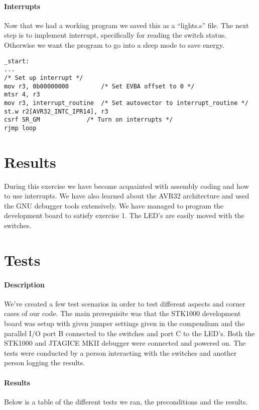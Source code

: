 \documentclass[a4paper,11pt]{article}
\begin{document}
\paragraph{Interrupts}
Now that we had a working program we saved this as a “lights.s” file. The next step is to implement interrupt, specifically for reading the switch status. Otherwise we want the program to go into a sleep mode to save energy. 

\begin{lstlisting}
_start:
...
/* Set up interrupt */
mov r3, 0b00000000  	   /* Set EVBA offset to 0 */
mtsr 4, r3			
mov r3, interrupt_routine  /* Set autovector to interrupt_routine */
st.w r2[AVR32_INTC_IPR14], r3	
csrf SR_GM  		   /* Turn on interrupts */
rjmp loop
\end{lstlisting}

\section{Results}
During this exercise we have become acquainted with assembly coding and how to use interrupts. We have also learned about the AVR32 architecture and used the GNU debugger tools extensively. We have managed to program the development board to satisfy exercise 1. The LED's are easily moved with the switches.

\section{Tests}
\paragraph{Description}
We've created a few test scenarios in order to test different aspects and corner cases of our code. The main prerequisite was that the STK1000 development board was setup with given jumper settings given in the compendium and the parallel I/O port B connected to the switches and port C to the LED’s. Both the STK1000 and JTAGICE MKII debugger were connected and powered on. The tests were conducted by a person interacting with the switches and another person logging the results.

\paragraph{Results}
Below is a table of the different tests we ran, the preconditions and the results.
\linebreak
\end{document}
